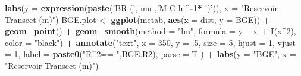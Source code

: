 \documentclass[]{article}
\newenvironment{Shaded}{\begin{snugshade}}{\end{snugshade}}
\newcommand{\DataTypeTok}[1]{\textcolor[rgb]{0.13,0.29,0.53}{#1}}
\newcommand{\DecValTok}[1]{\textcolor[rgb]{0.00,0.00,0.81}{#1}}
\newcommand{\FloatTok}[1]{\textcolor[rgb]{0.00,0.00,0.81}{#1}}
\newcommand{\KeywordTok}[1]{\textcolor[rgb]{0.13,0.29,0.53}{\textbf{#1}}}
\newcommand{\NormalTok}[1]{#1}
\newcommand{\OperatorTok}[1]{\textcolor[rgb]{0.81,0.36,0.00}{\textbf{#1}}}
\newcommand{\StringTok}[1]{\textcolor[rgb]{0.31,0.60,0.02}{#1}}
\begin{document}
\begin{Shaded}
\begin{Highlighting}[]
\StringTok{  }\KeywordTok{labs}\NormalTok{(}\DataTypeTok{y =} \KeywordTok{expression}\NormalTok{(}\KeywordTok{paste}\NormalTok{(}\StringTok{'BR ('}\NormalTok{, mu ,}\StringTok{'M C h'}\OperatorTok{^-}\DecValTok{1}\OperatorTok{*}\StringTok{ ')'}\NormalTok{)), }
       \DataTypeTok{x =} \StringTok{"Reservoir Transect (m)"}\NormalTok{)}
\NormalTok{BGE.plot <-}\StringTok{ }\KeywordTok{ggplot}\NormalTok{(metab, }\KeywordTok{aes}\NormalTok{(}\DataTypeTok{x =}\NormalTok{ dist, }\DataTypeTok{y =}\NormalTok{ BGE)) }\OperatorTok{+}\StringTok{ }
\StringTok{  }\KeywordTok{geom_point}\NormalTok{() }\OperatorTok{+}\StringTok{ }
\StringTok{  }\KeywordTok{geom_smooth}\NormalTok{(}\DataTypeTok{method =} \StringTok{"lm"}\NormalTok{, }\DataTypeTok{formula =}\NormalTok{ y }\OperatorTok{~}\StringTok{ }\NormalTok{x }\OperatorTok{+}\StringTok{ }\KeywordTok{I}\NormalTok{(x}\OperatorTok{^}\DecValTok{2}\NormalTok{), }\DataTypeTok{color =} \StringTok{"black"}\NormalTok{) }\OperatorTok{+}
\StringTok{  }\KeywordTok{annotate}\NormalTok{(}\StringTok{"text"}\NormalTok{, }\DataTypeTok{x =} \DecValTok{350}\NormalTok{, }\DataTypeTok{y =} \FloatTok{.5}\NormalTok{, }\DataTypeTok{size =} \DecValTok{5}\NormalTok{, }\DataTypeTok{hjust =} \DecValTok{1}\NormalTok{, }\DataTypeTok{vjust =} \DecValTok{1}\NormalTok{,}
           \DataTypeTok{label =} \KeywordTok{paste0}\NormalTok{(}\StringTok{"R^2== "}\NormalTok{,BGE.R2), }\DataTypeTok{parse =}\NormalTok{ T ) }\OperatorTok{+}
\StringTok{  }\KeywordTok{labs}\NormalTok{(}\DataTypeTok{y =} \StringTok{"BGE"}\NormalTok{, }
       \DataTypeTok{x =} \StringTok{"Reservoir Transect (m)"}\NormalTok{)}
\end{Highlighting}
\end{Shaded}
\end{document}
